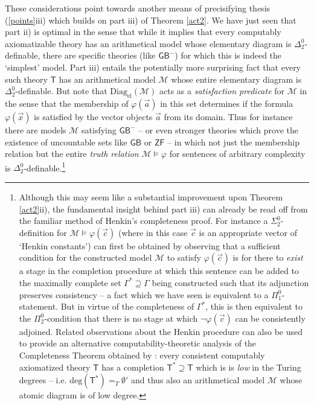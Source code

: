 \documentclass[11pt,fleqn,leqno]{article}
\def\phi{\varphi}
\begin{document}
These considerations point towards another means of precisifying thesis (\ref{points}iii) which builds on part iii) of Theorem \ref{act2}.   We have just seen that part ii) is optimal in the sense 
that while it implies that every computably axiomatizable theory has an arithmetical model whose elementary diagram is $\Delta^0_2$-definable, there are specific theories (like $\mathsf{GB}^-$) for which this is indeed the `simplest' model.   Part iii) entails the potentially more surprising fact that every such theory $\mathsf{T}$ has an arithmetical model $\mathcal{M}$ whose entire elementary diagram is $\Delta^0_2$-definable.   But note that $\mathrm{Diag}_{\mathrm{el}}(\mathcal{M})$ acts as a \textsl{satisfaction predicate} for $\mathcal{M}$ in the sense that the membership of $\phi(\vec{a})$ in this set determines if the formula $\phi(\vec{x})$ is satisfied by the vector objects $\vec{a}$ from its domain.  Thus for instance there are models $\mathcal{M}$ satisfying $\mathsf{GB}^-$ -- or even stronger theories which prove the existence of uncountable sets like $\mathsf{GB}$ or $\mathsf{ZF}$ -- in which not just the membership relation but the entire \textsl{truth relation} $\mathcal{M} \models \phi$ for sentences of arbitrary complexity is $\Delta^0_2$-definable.\footnote{Although this may seem like a substantial improvement upon Theorem \ref{act2}ii), the fundamental insight behind part iii) can already be read off from the familiar method of Henkin's completeness proof.  For instance a $\Sigma^0_2$-definition for $\mathcal{M} \models \phi(\vec{c})$ (where in this case $\vec{c}$ is an appropriate vector of `Henkin constants') can first be obtained by observing that a sufficient condition for the constructed model $\mathcal{M}$ to satisfy $\phi(\vec{c})$ is for there to \textsl{exist} a stage in the completion procedure at which this sentence can be added to the maximally complete set $\Gamma^* \supseteq \Gamma$  being constructed such that its adjunction preserves consistency -- a fact which we have seen is equivalent to a $\Pi^0_1$-statement.  But in virtue of the completeness of $\Gamma^*$, this is then equivalent to the $\Pi^0_2$-condition that there is no stage at which $\neg \phi(\vec{c})$ can be consistently adjoined.  Related observations about the Henkin procedure can also be used to provide an alternative  computability-theoretic analysis of the Completeness Theorem obtained by \citet{Jockusch1972}: every consistent computably axiomatized theory $\mathsf{T}$ has a completion $\mathsf{T}^* \supseteq \mathsf{T}$ which is is \textsl{low} in the Turing degrees -- i.e. $\mathrm{deg}(\mathsf{T}^*) =_T \emptyset'$ and thus also an arithmetical model $\mathcal{M}$ whose atomic diagram is of low degree.}
\end{document}
